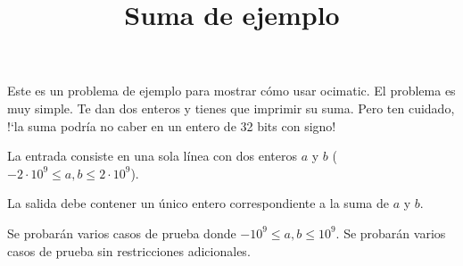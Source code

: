 \documentclass{oci}
\title{Suma de ejemplo}
\begin{document}
\begin{problemDescription}
  Este es un problema de ejemplo para mostrar cómo usar ocimatic.
  El problema es muy simple.
  Te dan dos enteros y tienes que imprimir su suma.
  Pero ten cuidado, !`la suma podría no caber en un entero de 32 bits con signo!
\end{problemDescription}

\begin{inputDescription}
  La entrada consiste en una sola línea con dos enteros $a$ y $b$ ($-2\cdot10^9 \leq a, b \leq 2\cdot10^9$).
\end{inputDescription}

\begin{outputDescription}
  La salida debe contener un único entero correspondiente a la suma de $a$ y $b$.
\end{outputDescription}

\begin{scoreDescription}
   Se probarán varios casos de prueba donde $-10^9\leq a, b \leq 10^9$.
   Se probarán varios casos de prueba sin restricciones adicionales.
\end{scoreDescription}

\begin{sampleDescription}
\end{sampleDescription}
\end{document}
